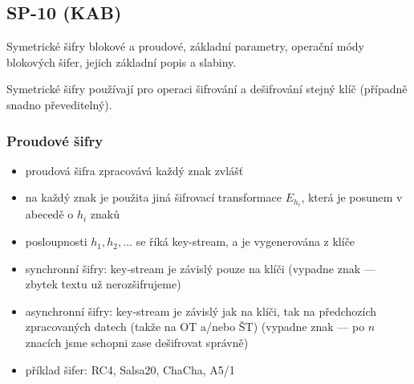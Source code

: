 \subsection{SP-10 (KAB)}
Symetrické šifry blokové a proudové, základní parametry, operační módy blokových šifer, jejich základní popis a slabiny.

Symetrické šifry používají pro operaci šifrování a dešifrování stejný klíč (případně snadno převeditelný).

\subsubsection*{Proudové šifry}
\begin{itemize}
	\item proudová šifra zpracovává každý znak zvlášť
	\item na každý znak je použita jiná šifrovací transformace $E_{h_i}$, která je posunem v abecedě o $h_i$ znaků
	\item posloupnosti $h_1, h_2, ...$ se říká key-stream, a je vygenerována z klíče
	\item synchronní šifry: key-stream je závislý pouze na klíči (vypadne znak --- zbytek textu už nerozšifrujeme)
	\item asynchronní šifry: key-stream je závislý jak na klíči, tak na předchozích zpracovaných datech (takže na OT a/nebo ŠT) (vypadne znak --- po $n$ znacích jsme schopni zase dešifrovat správně)
	
	\item příklad šifer: RC4, Salsa20, ChaCha, A5/1
\end{itemize}


